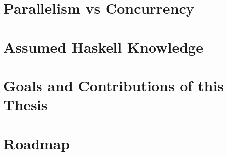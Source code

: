 \blindtext

\section{Parallelism vs Concurrency}
\label{sec:intro-parconc}
\blindtext

\section{Assumed Haskell Knowledge}
\label{sec:intro-assumed}
\blindtext

\section{Goals and Contributions of this Thesis}
\label{sec:intro-contributions}
\blindtext

\section{Roadmap}
\label{sec:intro-roadmap}
\blindtext
